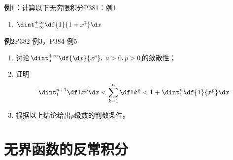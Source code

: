 \begin{frame}
	\linespread{1.2}
	\begin{exampleblock}{{\bf 例1：}计算以下无穷限积分\hfill P381：例1}
		\begin{enumerate}
		  \item $\dint_{-\infty}^{+\infty}\df{1}{1+x^2}\d x$
		\end{enumerate}
	\end{exampleblock}\pause 
	\begin{center}
		\end{center}
\end{frame}

\begin{frame}
	\linespread{1.2}
	\begin{exampleblock}{{\bf 例2}\hfill P382-例3，P384-例5}\pause 
		\begin{enumerate}
		  \item 讨论$\dint_a^{+\infty}\df{\d x}{x^p},\;a>0, p>0$的敛散性；\pause 
		  \item 证明$$\dint_1^{n+1}\df 1{x^p}\d x<\sum\limits_{k=1}^n\df 1{k^p}
		  <1+\dint_1^n\df{1}{x^p}\d x$$\pause 
		  \item 根据以上结论给出$p$级数的判敛条件。
		\end{enumerate}
	\end{exampleblock}
\end{frame}

\section{无界函数的反常积分}

